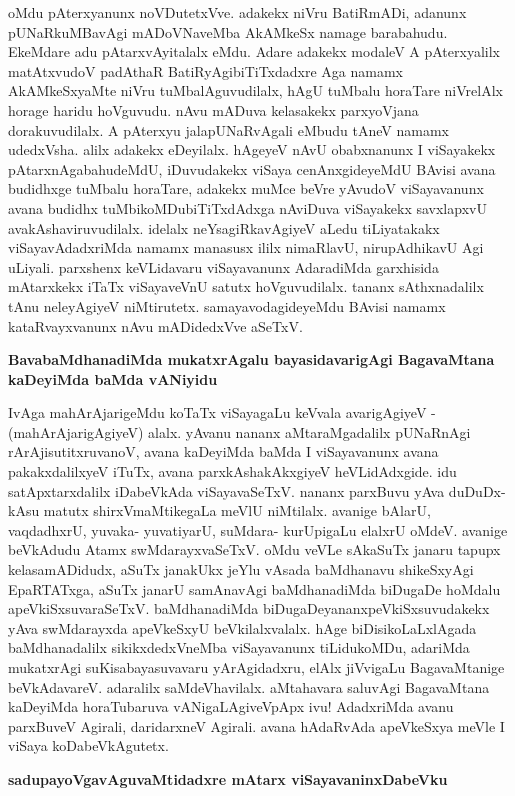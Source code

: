 \noindent
oMdu pAterxyanunx noVDutetxVve. adakekx niVru BatiRmADi, adanunx pUNaRkuMBavAgi mADoVNaveMba AkAMkeSx namage barabahudu. EkeMdare adu pAtarxvAyitalalx eMdu. Adare adakekx modaleV A pAterxyalilx matAtxvudoV padAthaR BatiRyAgibiTiTxdadxre Aga namamx AkAMkeSxyaMte niVru tuMbalAguvudilalx, hAgU tuMbalu horaTare niVrelAlx horage haridu hoVguvudu. nAvu mADuva kelasakekx parxyoVjana dorakuvudilalx. A pAterxyu jalapUNaRvAgali eMbudu tAneV namamx udedxVsha. alilx adakekx eDeyilalx. hAgeyeV nAvU obabxnanunx I viSayakekx pAtarxnAgabahudeMdU, iDuvudakekx viSaya cenAnxgideyeMdU BAvisi avana budidhxge tuMbalu horaTare, adakekx muMce beVre yAvudoV viSayavanunx avana budidhx tuMbikoMDubiTiTxdAdxga nAviDuva viSayakekx savxlapxvU avakAshaviruvudilalx. idelalx neYsagiRkavAgiyeV aLedu tiLiyatakakx viSayavAdadxriMda namamx manasusx ililx nimaRlavU, nirupAdhikavU Agi uLiyali. parxshenx keVLidavaru viSayavanunx AdaradiMda garxhisida mAtarxkekx iTaTx viSayaveVnU satutx hoVguvudilalx. tananx sAthxnadalilx tAnu neleyAgiyeV niMtirutetx. samayavodagideyeMdu BAvisi namamx kataRvayxvanunx nAvu mADidedxVve aSeTxV.

{\bigskip
\noindent
{\large\bf BavabaMdhanadiMda mukatxrAgalu bayasidavarigAgi BagavaMtana kaDeyiMda baMda vANiyidu}}\label{page251}
\medskip

\noindent
IvAga mahArAjarigeMdu koTaTx viSayagaLu keVvala avarigAgiyeV - (mahArAjarigAgiyeV) alalx. yAvanu nananx aMtaraMgadalilx pUNaRnAgi rArAjisutitxruvanoV, avana kaDeyiMda baMda I viSayavanunx avana pakakxdalilxyeV iTuTx, avana parxkAshakAkxgiyeV heVLidAdxgide. idu satApxtarxdalilx iDabeVkAda viSayavaSeTxV. nananx parxBuvu yAva duDuDx- kAsu matutx shirxVmaMtikegaLa meVlU niMtilalx. avanige bAlarU, vaqdadhxrU, yuvaka- yuvatiyarU, suMdara- kurUpigaLu elalxrU oMdeV. avanige beVkAdudu Atamx swMdarayxvaSeTxV. oMdu veVLe sAkaSuTx janaru tapupx kelasamADidudx, aSuTx janakUkx jeYlu vAsada baMdhanavu shikeSxyAgi EpaRTATxga, aSuTx janarU samAnavAgi baMdhanadiMda biDugaDe hoMdalu apeVkiSxsuvaraSeTxV. baMdhanadiMda biDugaDeyananxpeVkiSxsuvudakekx yAva swMdarayxda apeVkeSxyU beVkilalxvalalx. hAge biDisikoLaLxlAgada baMdhanadalilx sikikxdedxVneMba viSayavanunx tiLidukoMDu, adariMda mukatxrAgi suKisabayasuvavaru yArAgidadxru, elAlx jiVvigaLu BagavaMtanige beVkAdavareV. adaralilx saMdeVhavilalx. aMtahavara saluvAgi BagavaMtana kaDeyiMda horaTubaruva vANigaLAgiveVpApx ivu! AdadxriMda avanu parxBuveV Agirali, daridarxneV Agirali. avana hAdaRvAda apeVkeSxya meVle I viSaya koDabeVkAgutetx.

{\bigskip
\noindent
{\large\bf sadupayoVgavAguvaMtidadxre mAtarx viSayavaninxDabeVku}}\label{page252}
\medskip

